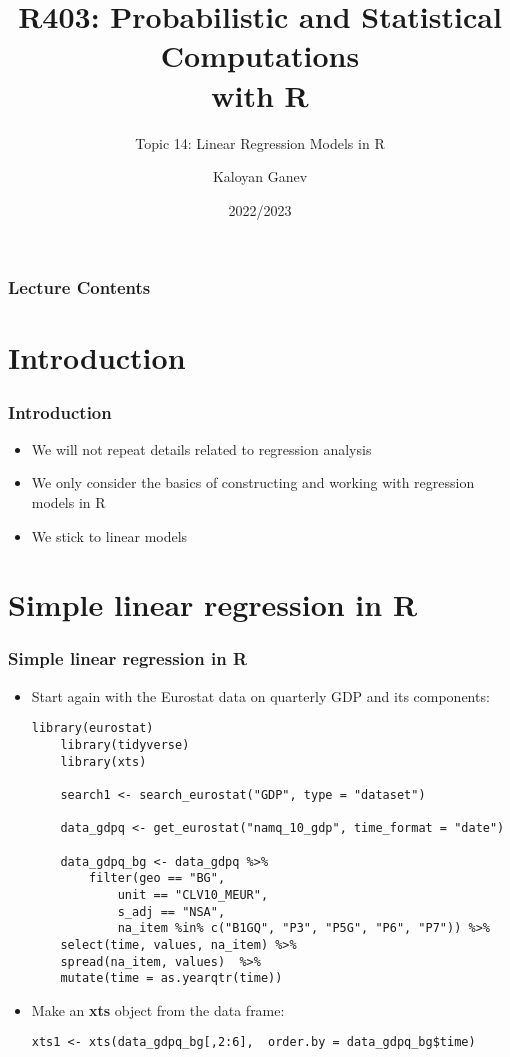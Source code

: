 \documentclass[10pt]{beamer}
\title{R403: Probabilistic and Statistical Computations\\ with R}
\subtitle{Topic 14: \textcolor{myred}{Linear Regression Models in R}}
\author{Kaloyan Ganev}
\date{2022/2023}
\theoremstyle{definition}
\begin{document}
\maketitle

\begin{frame}[fragile]
\frametitle{Lecture Contents}
\tableofcontents
\end{frame}

\section{Introduction}
\begin{frame}[fragile]
\frametitle{Introduction}
\begin{itemize}
	\item We will not repeat details related to regression analysis
	\item We only consider the basics of constructing and working with regression models in R
	\item We stick to linear models
\end{itemize}
\end{frame}

\section{Simple linear regression in R}
\begin{frame}[fragile]
\frametitle{Simple linear regression in R}
\begin{itemize}
	\item Start again with the Eurostat data on quarterly GDP and its components:
	\begin{lstlisting}[style = rstyle, breaklines]
	library(eurostat)
	library(tidyverse)
	library(xts)

	search1 <- search_eurostat("GDP", type = "dataset")

	data_gdpq <- get_eurostat("namq_10_gdp", time_format = "date")

	data_gdpq_bg <- data_gdpq %>%
		filter(geo == "BG", 
        	unit == "CLV10_MEUR",
  		    s_adj == "NSA",
        	na_item %in% c("B1GQ", "P3", "P5G", "P6", "P7")) %>%
	select(time, values, na_item) %>%
	spread(na_item, values)  %>%
	mutate(time = as.yearqtr(time))
	\end{lstlisting}
	\item Make an \textbf{xts} object from the data frame:
	\begin{lstlisting}[style = rstyle, breaklines]
	xts1 <- xts(data_gdpq_bg[,2:6],  order.by = data_gdpq_bg$time)
	\end{lstlisting}
\end{itemize} 
\end{frame}
\end{document}
